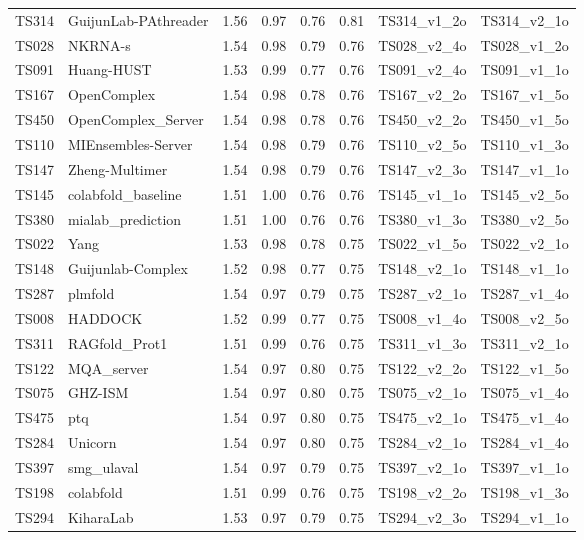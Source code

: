 \begin{longtable}{llllllll}
TS314 & GuijunLab-PAthreader & 1.56 & 0.97 & 0.76 & 0.81 & TS314\_v1\_2o & TS314\_v2\_1o \\ 
TS028 & NKRNA-s & 1.54 & 0.98 & 0.79 & 0.76 & TS028\_v2\_4o & TS028\_v1\_2o \\ 
TS091 & Huang-HUST & 1.53 & 0.99 & 0.77 & 0.76 & TS091\_v2\_4o & TS091\_v1\_1o \\ 
TS167 & OpenComplex & 1.54 & 0.98 & 0.78 & 0.76 & TS167\_v2\_2o & TS167\_v1\_5o \\ 
TS450 & OpenComplex\_Server & 1.54 & 0.98 & 0.78 & 0.76 & TS450\_v2\_2o & TS450\_v1\_5o \\ 
TS110 & MIEnsembles-Server & 1.54 & 0.98 & 0.79 & 0.76 & TS110\_v2\_5o & TS110\_v1\_3o \\ 
TS147 & Zheng-Multimer & 1.54 & 0.98 & 0.79 & 0.76 & TS147\_v2\_3o & TS147\_v1\_1o \\ 
TS145 & colabfold\_baseline & 1.51 & 1.00 & 0.76 & 0.76 & TS145\_v1\_1o & TS145\_v2\_5o \\ 
TS380 & mialab\_prediction & 1.51 & 1.00 & 0.76 & 0.76 & TS380\_v1\_3o & TS380\_v2\_5o \\ 
TS022 & Yang & 1.53 & 0.98 & 0.78 & 0.75 & TS022\_v1\_5o & TS022\_v2\_1o \\ 
TS148 & Guijunlab-Complex & 1.52 & 0.98 & 0.77 & 0.75 & TS148\_v2\_1o & TS148\_v1\_1o \\ 
TS287 & plmfold & 1.54 & 0.97 & 0.79 & 0.75 & TS287\_v2\_1o & TS287\_v1\_4o \\ 
TS008 & HADDOCK & 1.52 & 0.99 & 0.77 & 0.75 & TS008\_v1\_4o & TS008\_v2\_5o \\ 
TS311 & RAGfold\_Prot1 & 1.51 & 0.99 & 0.76 & 0.75 & TS311\_v1\_3o & TS311\_v2\_1o \\ 
TS122 & MQA\_server & 1.54 & 0.97 & 0.80 & 0.75 & TS122\_v2\_2o & TS122\_v1\_5o \\ 
TS075 & GHZ-ISM & 1.54 & 0.97 & 0.80 & 0.75 & TS075\_v2\_1o & TS075\_v1\_4o \\ 
TS475 & ptq & 1.54 & 0.97 & 0.80 & 0.75 & TS475\_v2\_1o & TS475\_v1\_4o \\ 
TS284 & Unicorn & 1.54 & 0.97 & 0.80 & 0.75 & TS284\_v2\_1o & TS284\_v1\_4o \\ 
TS397 & smg\_ulaval & 1.54 & 0.97 & 0.79 & 0.75 & TS397\_v2\_1o & TS397\_v1\_1o \\ 
TS198 & colabfold & 1.51 & 0.99 & 0.76 & 0.75 & TS198\_v2\_2o & TS198\_v1\_3o \\ 
TS294 & KiharaLab & 1.53 & 0.97 & 0.79 & 0.75 & TS294\_v2\_3o & TS294\_v1\_1o \\ 

\end{longtable}
